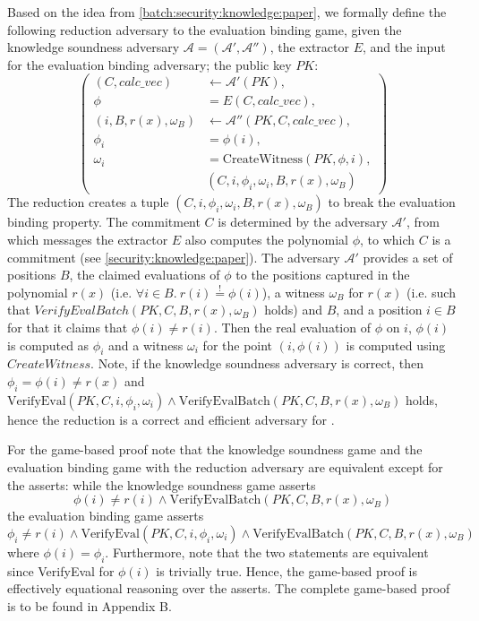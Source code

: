 Based on the idea from \ref{batch:security:knowledge:paper}, we formally define the following reduction adversary to the evaluation binding game, given the knowledge soundness adversary $\mathcal{A=(A',A'')}$, the extractor $E$, and the input for the evaluation binding adversary; the public key $PK$:
\begin{equation*}
    \left(
        \begin{aligned}
            (C,calc\_vec) &\leftarrow \mathcal{A'}(PK), \\
            \phi &= E(C, calc\_vec),\\
            (i, B, r(x), \omega_B) &\leftarrow \mathcal{A''}(PK, C, calc\_vec), \\
            \phi_i &= \phi(i), \\
            \omega_i &= \text{CreateWitness}(PK,\phi, i), \\
            &  (C, i, \phi_i, \omega_i, B, r(x), \omega_B)
        \end{aligned}
        \right)
\end{equation*}
The reduction creates a tuple $(C, i, \phi_i, \omega_i, B, r(x), \omega_B)$ to break the evaluation binding property. The commitment $C$ is determined by the adversary $\mathcal{A'}$, from which messages the extractor $E$ also computes the polynomial $\phi$, to which $C$ is a commitment (see \ref{security:knowledge:paper}). The adversary $\mathcal{A'}$ provides a set of positions $B$, the claimed evaluations of $\phi$ to the positions captured in the polynomial $r(x)$ (i.e. $\forall i\in B.\ r(i)\stackrel{!}{=}\phi(i)$), a witness $\omega_B$ for $r(x)$ (i.e. such that $VerifyEvalBatch(PK,C,B,r(x), \omega_B)$ holds) and $B$, and a position $i \in B$ for that it claims that $\phi(i) \ne r(i)$. Then the real evaluation of $\phi$ on $i$, $\phi(i)$ is computed as $\phi_i$ and a witness $\omega_i$ for the point $(i,\phi(i))$ is computed using $CreateWitness$.
Note, if the knowledge soundness adversary is correct, then $\phi_i=\phi(i)\ne r(x)$ and $\text{VerifyEval}(PK,C,i,\phi_i,\omega_i) \land \text{VerifyEvalBatch}(PK,C,B, r(x),\omega_B)$ holds, hence the reduction is a correct and efficient adversary for .

For the game-based proof note that the knowledge soundness game and the evaluation binding game with the reduction adversary are equivalent except for the asserts: while the knowledge soundness game asserts 
$$\phi(i) \ne r(i) \land \text{VerifyEvalBatch}(PK, C, B,r(x),\omega_B)$$ the evaluation binding game asserts 
$$\phi_i \ne r(i) \land \text{VerifyEval}(PK, C, i, \phi_i, \omega_i) \land \text{VerifyEvalBatch}(PK, C, B, r(x), \omega_B)$$ where $\phi(i)=\phi_i$. Furthermore, note that the two statements are equivalent since VerifyEval for $\phi(i)$ is trivially true. Hence, the game-based proof is effectively equational reasoning over the asserts. The complete game-based proof is to be found in Appendix B.

